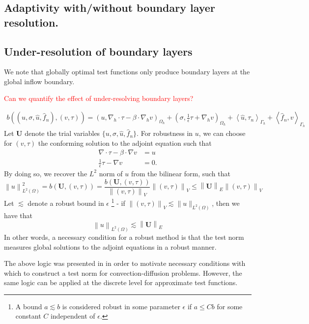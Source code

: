 \documentclass[11pt,onecolumn]{scrartcl}
\newcommand{\nor}[1]{\left\| #1 \right\|}
\newcommand{\LRp}[1]{\left( #1 \right)}
\newcommand{\LRa}[1]{\left\langle #1 \right\rangle}
\newcommand{\Grad} {\ensuremath{\nabla}}
\newcommand{\uh}{\widehat{u}}
\newcommand{\fnh}{\widehat{f}_n}
\newcommand{\Gh}{\Gamma_h}
\newcommand{\Oh}{\Omega_h}
\newcommand{\grad}{\nabla}
\renewcommand{\div}{\grad \cdot}
\begin{document}
\subsection{Adaptivity with/without boundary layer resolution.}

\subsection{Under-resolution of boundary layers}
We note that globally optimal test functions only produce boundary layers at the global inflow boundary.

\textcolor{red}{Can we quantify the effect of under-resolving boundary layers?}

\begin{align*}
b\LRp{\LRp{u,\sigma, \uh,\fnh},\LRp{v,\tau}} = \LRp{u, \Grad_h\cdot \tau - \beta\cdot \Grad_h v}_{\Oh} + \LRp{\sigma, \frac{1}{\epsilon}\tau + \Grad_h v}_{\Oh} + \LRa{\uh,\tau_n}_{\Gh} + \LRa{\fnh,v}_{\Gh}
\end{align*}
Let $\boldsymbol U$ denote the trial variables $\{u,\sigma, \uh, \fnh\}$. For robustness in $u$, we can choose for $\LRp{v,\tau}$ the conforming solution to the adjoint equation such that 
\begin{align*}
\div \tau - \beta \cdot \grad v &= u \\
\frac{1}{\epsilon} \tau - \grad v &= 0. 
\end{align*}
By doing so, we recover the $L^2$ norm of $u$ from the bilinear form, such that
\[
\nor{u}^2_{L^2(\Omega)} = b\LRp{{\boldsymbol U},\LRp{v,\tau}} = \frac{b\LRp{{\boldsymbol U},\LRp{v,\tau}}}{\nor{\LRp{v,\tau}}_V} \nor{\LRp{v,\tau}}_V \leq \nor{\boldsymbol U}_E \nor{\LRp{v,\tau}}_V
\]
Let $\lesssim$ denote a robust bound in $\epsilon$
\footnote{A bound $a \lesssim b$ is considered robust in some parameter $\epsilon$ if $a \leq C b$ for some constant $C$ independent of $\epsilon$.}
  - if $\nor{\LRp{v,\tau}}_V \lesssim \|u\|_{L^2(\Omega)}$, then we have that
\[
\nor{u}_{L^2(\Omega)} \lesssim \nor{\boldsymbol U}_E
\]
In other words, a necessary condition for a robust method is that the test norm measures global solutions to the adjoint equations in a robust manner.  

The above logic was presented in \cite{DPGrobustness, ChanHeuerBui-ThanhDemkowicz12} in order to motivate necessary conditions with which to construct a test norm for convection-diffusion problems.  However, the same logic can be applied at the discrete level for approximate test functions.  
\end{document}
